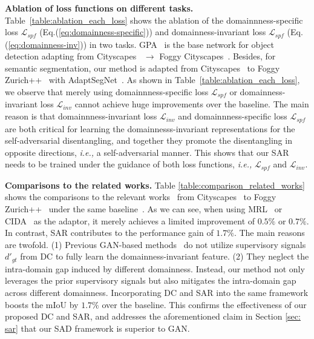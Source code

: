 \documentclass[10pt,journal,compsoc]{IEEEtran}
\begin{document}
\noindent \textbf{Ablation of loss functions on different tasks.} 
Table~\ref{table:ablation_each_loss}  shows the ablation of the domainnness-specific loss $\mathcal{L}_{spf}$ (Eq.(\ref{eq:domainness-specific})) and domainness-invariant loss $\mathcal{L}_{spf}$ (Eq.(\ref{eq:domainness-inv})) in two tasks. 
GPA~\cite{GPA} is the base network for object detection adapting from Cityscapes~\cite{cordts2016cityscapes} $\rightarrow$  Foggy Cityscapes~\cite{FoggyCity}. Besides, for semantic segmentation, our method is adapted from  Cityscapes~\cite{cordts2016cityscapes} to Foggy Zurich++~\cite{FoggyCity,FoggyDriving} with AdaptSegNet~\cite{AdaptSegNet}. 
As shown in Table~\ref{table:ablation_each_loss}, we observe that merely using domainnness-specific loss $\mathcal{L}_{spf}$ or domainness-invariant loss $\mathcal{L}_{inv}$ cannot achieve huge improvements over the baseline. The main reason is that domainnness-invariant loss $\mathcal{L}_{inv}$ and domainnness-specific loss $\mathcal{L}_{spf}$ are both critical for learning the domainnesss-invariant representations for the self-adversarial disentangling, and together they promote the disentangling in opposite directions, \emph{i.e.,} a self-adversarial manner. 
This shows that our SAR needs to be trained under the guidance of both loss functions,  \emph{i.e.,} $\mathcal{L}_{spf}$ and $\mathcal{L}_{inv}$. 


\noindent \textbf{Comparisons to the related works.}
Table \ref{table:comparison_related_works} shows the comparisons to the relevant works~\cite{DDMRL, CIDA} from Cityscapes~\cite{cordts2016cityscapes} to Foggy Zurich++~\cite{FoggyCity,FoggyDriving} under the same baseline~\cite{AdaptSegNet}.
As we can see, when using MRL~\cite{DDMRL} or CIDA~\cite{CIDA} as the adaptor, it merely achieves a limited improvement of $0.5\%$ or $0.7\%$. In contrast, SAR  contributes to the performance gain of $1.7\%$. 
The main reasons are twofold. (1) Previous GAN-based methods~\cite{DDMRL, CIDA} do not utilize supervisory signals $d'_{gt}$ from DC to fully learn the domainness-invariant feature. (2) They neglect the intra-domain gap induced by different domainness. Instead, our method not only leverages the prior supervisory signals but also mitigates the intra-domain gap across different domainness. Incorporating DC and SAR into the same framework boosts the mIoU by $1.7\%$ over the baseline. This confirms the effectiveness of our proposed DC and SAR, and addresses the aforementioned claim in Section \ref{sec: sar} that our SAD framework is superior to GAN.
\end{document}

